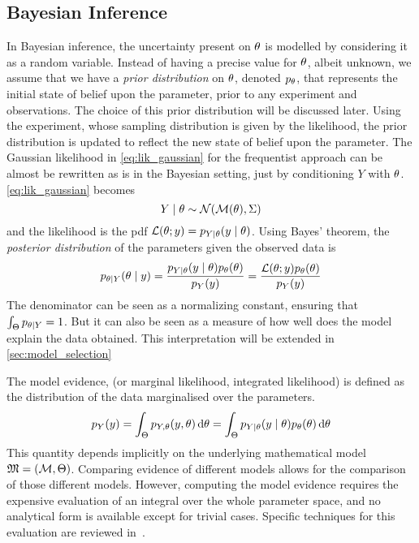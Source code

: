 \documentclass[../../Main_ManuscritThese.tex]{subfiles}
\begin{document}
\subsection{Bayesian Inference}
\label{sec:bayesian_inference_MAP}
In Bayesian inference, the uncertainty present on $\theta$ is modelled by
considering it as a random variable. Instead of having a precise value
for $\theta$, albeit unknown, we assume that we have a \emph{prior
  distribution} on $\theta$, denoted $p_{\theta}$, that represents the
initial state of belief upon the parameter, prior to any experiment
and observations. The choice of this prior distribution will be
discussed later.  Using the experiment, whose sampling distribution is
given by the likelihood, the prior distribution is updated to reflect
the new state of belief upon the parameter.  The Gaussian likelihood
in \cref{eq:lik_gaussian} for the frequentist approach can be almost
be rewritten as is in the Bayesian setting, just by conditioning $Y$
with $\theta$.  \cref{eq:lik_gaussian} becomes
\begin{equation}
  Y \mid  \theta \sim \mathcal{N}(\mathcal{M}(\theta), \Sigma)
\end{equation}
and the likelihood is the pdf
$\mathcal{L}(\theta;y) = p_{Y\mid \theta}(y \mid \theta)$.  Using Bayes'
theorem, the \emph{posterior distribution} of the parameters given the
observed data is
\begin{equation}
  \label{eq:bayes_posterior}
  p_{\theta \mid Y}(\theta \mid y) = \frac{p_{Y\mid \theta}(y \mid  \theta)p_{\theta}(\theta)}{p_Y(y)} = \frac{\mathcal{L}(\theta;y)p_{\theta}(\theta)}{p_Y(y)}
\end{equation}
The denominator can be seen as a normalizing constant, ensuring that
$\int_{\Theta} p_{\theta \mid Y} = 1$. But it can also be seen as a
measure of how well does the model explain the data obtained. This
interpretation will be extended in \cref{sec:model_selection}
\begin{definition}
\label{def:model_evidence}
The model evidence, (or marginal likelihood, integrated likelihood) is
defined as the distribution of the data marginalised over the
parameters.
  \begin{equation}
    \label{eq:model_evidence}
    p_Y(y) = \int_{\Theta}p_{Y,\theta}(y,\theta)\,\mathrm{d}\theta = \int_{\Theta}p_{Y \mid \theta}(y \mid \theta)p_{\theta}(\theta)\,\mathrm{d}\theta
  \end{equation}
  This quantity depends implicitly on the underlying mathematical
  model $\mathfrak{M} = (\mathcal{M},\Theta)$. Comparing evidence of
  different models allows for the comparison of those different
  models. However, computing the model evidence requires the expensive
  evaluation of an integral over the whole parameter space, and no
  analytical form is available except for trivial cases. Specific
  techniques for this evaluation are reviewed
  in~\cite{friel_estimating_2011}.
\end{definition}
\end{document}
